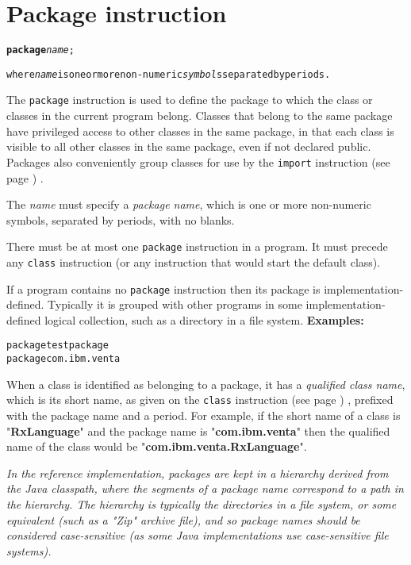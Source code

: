 \chapter{Package instruction}\label{refpackage}
\begin{shaded}
\begin{alltt}
\textbf{package} \emph{name};

where \emph{name} is one or more non-numeric \emph{symbol}s separated by periods.
\end{alltt}
\end{shaded}
 
The \texttt{package} instruction is used to define the package to which
the class or classes in the current program belong.
 Classes that belong to the same package have privileged access to
other classes in the same package, in that each class is visible to all
other classes in the same package, even if not declared public.
Packages also conveniently group classes for use by the
 \texttt{import} instruction (see page \pageref{refimport}) .
 
The \emph{name} must specify a \emph{package name}, which is one
or more non-numeric symbols, separated by periods, with no
blanks.
 
There must be at most one \texttt{package} instruction in a program.
It must precede any \texttt{class} instruction (or any instruction that
would start the default class).
 
If a program contains no \texttt{package} instruction then its package
is implementation-defined.  Typically it is grouped with other programs
in some implementation-defined logical collection, such as a directory
in a file system.
 \textbf{Examples:}
\begin{alltt}
package testpackage
package com.ibm.venta
\end{alltt}
 
When a class is identified as belonging to a package, it has a
\emph{qualified class name}, which is its short name, as given on the
 \texttt{class} instruction (see page \pageref{refclass}) , prefixed with the package
name and a period.
For example, if the short name of a class is
"\textbf{RxLanguage}" and the package name is
"\textbf{com.ibm.venta}" then the qualified name of the class
would be "\textbf{com.ibm.venta.RxLanguage}".
 
\emph{In the reference implementation, packages are kept in a hierarchy
derived from the Java classpath, where the segments of a package name
correspond to a path in the hierarchy.
The hierarchy is typically the directories in a file system, or some
equivalent (such as a "Zip" archive file), and so package names
should be considered case-sensitive (as some Java implementations use
case-sensitive file systems).
}
